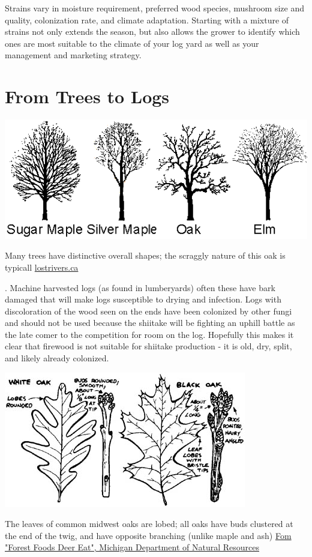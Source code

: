 \documentclass{tufte-handout}
\begin{document}
Strains vary in moisture requirement, preferred wood species, mushroom size and quality, colonization rate, and climate adaptation. 
Starting with a mixture of strains not only extends the season,  but also allows the grower to identify which ones are most
suitable to the climate of your log yard as well as your management
and marketing strategy.

\section{From Trees to Logs}

\begin{marginfigure}
\includegraphics{figures/tree-forms}
\caption{Many trees have distinctive overall shapes; the scraggly nature of this oak is typicall \href{http://www.lostrivers.ca/content/points/treeswinter.html}{lostrivers.ca}}
\end{marginfigure}

. 
Machine harvested logs (as found in lumberyards) often these have bark damaged that will make logs susceptible to drying and infection. 
Logs with discoloration of the wood seen on the ends have been colonized by other fungi and should not be used because the shiitake will be fighting an uphill battle as the late comer to the competition for room on the log.
Hopefully this makes it clear that firewood is not suitable for shiitake production - it is old, dry, split, and likely already colonized.

\begin{marginfigure}
\includegraphics{figures/oak-leaves-twigs}
\caption{The leaves of common midwest oaks are lobed; all oaks have buds clustered at the end of the twig, and have opposite branching (unlike maple and ash)  
\href{http://www.michigan.gov/dnr/0,4570,7-153-10370_12148-61306--,00.html}{Fom "Forest Foods Deer Eat", Michigan Department of Natural Resources}
}
\end{marginfigure}
\end{document}

